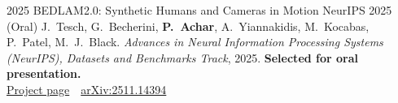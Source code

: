 \documentclass[9pt]{developercv} %
\begin{document}
\vspace{-10 pt}
\begin{entrylist}
    \entry
        {2025}
        {BEDLAM2.0: Synthetic Humans and Cameras in Motion}
        {NeurIPS 2025 (Oral)}
        {J.~Tesch, G.~Becherini, \textbf{P.~Achar}, A.~Yiannakidis, M.~Kocabas, P.~Patel, M.~J.~Black.
        \textit{Advances in Neural Information Processing Systems (NeurIPS), Datasets and Benchmarks Track}, 2025. \textbf{Selected for oral presentation.}
        \\ \href{https://bedlam2.is.tue.mpg.de/}{Project page} \,\textbullet\, \href{https://arxiv.org/abs/2511.14394}{arXiv:2511.14394}}
\end{entrylist}
\end{document}
